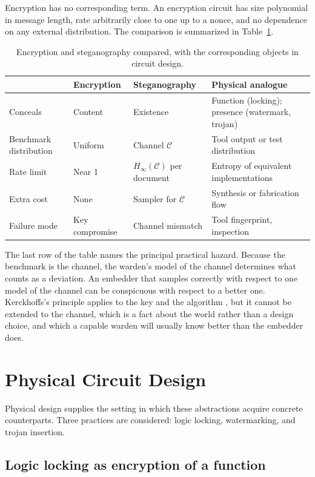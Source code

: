 \documentclass[11pt]{article}
\theoremstyle{definition}
\theoremstyle{remark}
\newcommand{\Hmin}{H_{\infty}}
\begin{document}
Encryption has no corresponding term. An encryption circuit has size polynomial in message length, rate arbitrarily close to one up to a nonce, and no dependence on any external distribution. The comparison is summarized in Table~\ref{tab:compare}.

\begin{table}[h]
\centering
\small
\begin{tabular}{@{}p{2.8cm}p{3.2cm}p{3.4cm}p{3.4cm}@{}}
\toprule
 & Encryption & Steganography & Physical analogue \\
\midrule
Conceals & Content & Existence & Function (locking); presence (watermark, trojan) \\
Benchmark distribution & Uniform & Channel $\mathcal{C}$ & Tool output or test distribution \\
Rate limit & Near 1 & $\Hmin(\mathcal{C})$ per document & Entropy of equivalent implementations \\
Extra cost & None & Sampler for $\mathcal{C}$ & Synthesis or fabrication flow \\
Failure mode & Key compromise & Channel mismatch & Tool fingerprint, inspection \\
\bottomrule
\end{tabular}
\caption{Encryption and steganography compared, with the corresponding objects in circuit design.}
\label{tab:compare}
\end{table}

The last row of the table names the principal practical hazard. Because the benchmark is the channel, the warden's model of the channel determines what counts as a deviation. An embedder that samples correctly with respect to one model of the channel can be conspicuous with respect to a better one. Kerckhoffs's principle applies to the key and the algorithm \cite{kerckhoffs1883}, but it cannot be extended to the channel, which is a fact about the world rather than a design choice, and which a capable warden will usually know better than the embedder does.

\section{Physical Circuit Design}

Physical design supplies the setting in which these abstractions acquire concrete counterparts. Three practices are considered: logic locking, watermarking, and trojan insertion.

\subsection{Logic locking as encryption of a function}
\end{document}
